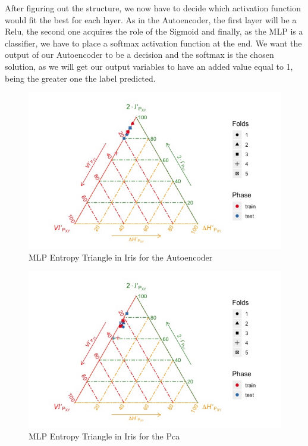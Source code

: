 \documentclass[12pt]{report}
\begin{document}
After figuring out the structure, we now have to decide which activation function would fit the best for each layer. As in the Autoencoder, the first layer will be a Relu, the second one acquires the role of the Sigmoid and finally, as the MLP is a classifier, we have to place a softmax activation function at the end. We want the output of our Autoencoder to be a decision and the softmax is the chosen solution, as we will get our output variables to have an added value equal to 1, being the greater one the label predicted. \par

\begin{figure}[H]
	
	\includegraphics[width=1\linewidth]{Figuras_tfg/ET_Iris_Auto_Mlp}
	\caption{MLP Entropy Triangle in Iris for the Autoencoder}
	\label{fig:figure_ET_MLP_Iris_Autoencoder}
\end{figure}

\begin{figure}[H]
	
	\includegraphics[width=1\linewidth]{Figuras_tfg/ET_Iris_Pca_Mlp}
	\caption{MLP Entropy Triangle in Iris for the Pca}
	\label{fig:figure_ET_MLP_Iris_Pca}
\end{figure}
\end{document}
